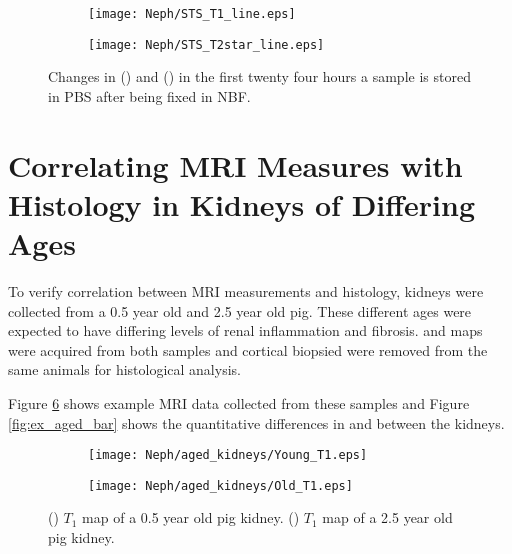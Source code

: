 \begin{figure}[H]
	\centering
	\begin{subfigure}[c]{0.47\textwidth}
		\centering
		\texttt{[image: Neph/STS\_T1\_line.eps]}
		\caption{}
		\label{fig:ex_fixation_t1_3t_sts}
	\end{subfigure}
	\hfill
	\begin{subfigure}[c]{0.47\textwidth}
		\centering
		\texttt{[image: Neph/STS\_T2star\_line.eps]}
		\caption{}
		\label{fig:ex_fixation_t2star_3t_sts}
	\end{subfigure}
	\caption{Changes in \tone () and \ttwostar () in the first twenty four hours a sample is stored in \ac{PBS} after being fixed in \ac{NBF}.}
	\label{fig:ex_fixation_sts}
\end{figure}

\section{Correlating MRI Measures with Histology in Kidneys of Differing Ages}
\label{sec:ex_ages}
To verify correlation between \ac{MRI} measurements and histology, kidneys were collected from a 0.5 year old and 2.5 year old pig. These different ages were expected to have differing levels of renal inflammation and fibrosis. \tone and \ttwostar maps were acquired from both samples and cortical biopsied were removed from the same animals for histological analysis. 

Figure \ref{fig:ex_aged_map} shows example \ac{MRI} data collected from these samples and Figure \ref{fig:ex_aged_bar} shows the quantitative differences in \tone and \ttwo between the kidneys. 

\begin{figure}[H]
	\centering
	\begin{subfigure}[c]{0.47\textwidth}
		\centering
		\texttt{[image: Neph/aged\_kidneys/Young\_T1.eps]}
		\caption{}
		\label{fig:ex_aged_t1_map}
	\end{subfigure}
	\hfill
	\begin{subfigure}[c]{0.47\textwidth}
		\centering
		\texttt{[image: Neph/aged\_kidneys/Old\_T1.eps]}
		\caption{}
		\label{fig:ex_aged_t2star_map}
	\end{subfigure}
	\caption{() $T_1$ map of a 0.5 year old pig kidney. () $T_1$ map of a 2.5 year old pig kidney.}
	\label{fig:ex_aged_map}
\end{figure}

